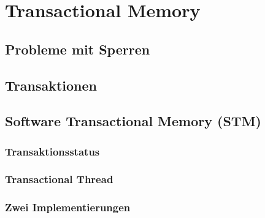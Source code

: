 \chapter{Transactional Memory}

\section{Probleme mit Sperren}

\section{Transaktionen}

\section{Software Transactional Memory (STM)}

\subsection{Transaktionsstatus}

\subsection{Transactional Thread}

\subsection{Zwei Implementierungen}